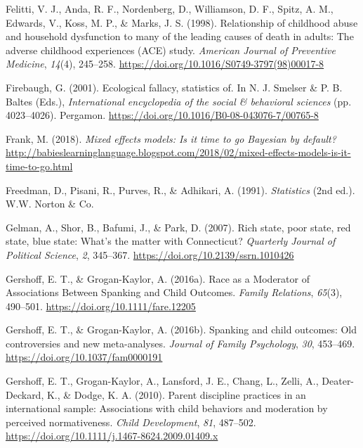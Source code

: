 \documentclass[
  letterpaper,
  DIV=11,
  numbers=noendperiod]{scrreprt}
\newlength{\cslhangindent}
\newenvironment{CSLReferences}[2] %
 {\begin{list}{}{%
  \setlength{\itemindent}{0pt}
  \setlength{\leftmargin}{0pt}
  \setlength{\parsep}{0pt}
  \ifodd #1
   \setlength{\leftmargin}{\cslhangindent}
   \setlength{\itemindent}{-1\cslhangindent}
  \fi
  \setlength{\itemsep}{#2\baselineskip}}}
 {\end{list}}
\begin{document}
\begin{CSLReferences}{1}{0}
Felitti, V. J., Anda, R. F., Nordenberg, D., Williamson, D. F., Spitz,
A. M., Edwards, V., Koss, M. P., \& Marks, J. S. (1998). Relationship of
childhood abuse and household dysfunction to many of the leading causes
of death in adults: The adverse childhood experiences (ACE) study.
\emph{American Journal of Preventive Medicine}, \emph{14}(4), 245--258.
\url{https://doi.org/10.1016/S0749-3797(98)00017-8}

Firebaugh, G. (2001). Ecological fallacy, statistics of. In N. J.
Smelser \& P. B. Baltes (Eds.), \emph{International encyclopedia of the
social \& behavioral sciences} (pp. 4023--4026). Pergamon.
\url{https://doi.org/10.1016/B0-08-043076-7/00765-8}

Frank, M. (2018). \emph{Mixed effects models: Is it time to go
{B}ayesian by default?}
\url{http://babieslearninglanguage.blogspot.com/2018/02/mixed-effects-models-is-it-time-to-go.html}

Freedman, D., Pisani, R., Purves, R., \& Adhikari, A. (1991).
\emph{Statistics} (2nd ed.). W.W. Norton \& Co.

Gelman, A., Shor, B., Bafumi, J., \& Park, D. (2007). Rich state, poor
state, red state, blue state: What's the matter with {C}onnecticut?
\emph{Quarterly Journal of Political Science}, \emph{2}, 345--367.
\url{https://doi.org/10.2139/ssrn.1010426}

Gershoff, E. T., \& Grogan-Kaylor, A. (2016a). {Race as a Moderator of
Associations Between Spanking and Child Outcomes}. \emph{Family
Relations}, \emph{65}(3), 490--501.
\url{https://doi.org/10.1111/fare.12205}

Gershoff, E. T., \& Grogan-Kaylor, A. (2016b). Spanking and child
outcomes: Old controversies and new meta-analyses. \emph{Journal of
Family Psychology}, \emph{30}, 453--469.
\url{https://doi.org/10.1037/fam0000191}

Gershoff, E. T., Grogan-Kaylor, A., Lansford, J. E., Chang, L., Zelli,
A., Deater-Deckard, K., \& Dodge, K. A. (2010). Parent discipline
practices in an international sample: Associations with child behaviors
and moderation by perceived normativeness. \emph{Child Development},
\emph{81}, 487--502.
\url{https://doi.org/10.1111/j.1467-8624.2009.01409.x}


\end{CSLReferences}
\end{document}
